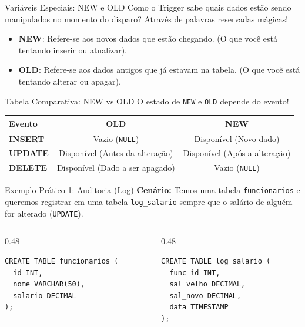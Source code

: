 \documentclass[9pt]{beamer}
\begin{document}
\begin{frame}{Variáveis Especiais: NEW e OLD}
    Como o Trigger sabe quais dados estão sendo manipulados no momento do disparo? Através de palavras reservadas mágicas!
    
    \begin{itemize}
        \item \textbf{NEW}: Refere-se aos novos dados que estão chegando. (O que você está tentando inserir ou atualizar).
        \item \textbf{OLD}: Refere-se aos dados antigos que já estavam na tabela. (O que você está tentando alterar ou apagar).
    \end{itemize}
\end{frame}

\begin{frame}{Tabela Comparativa: NEW vs OLD}
    O estado de \texttt{NEW} e \texttt{OLD} depende do evento!
    
    \vspace{0.5cm}
    \begin{center}
        \renewcommand{\arraystretch}{1.5}
        \begin{tabular}{|l|c|c|}
            \hline
            \textbf{Evento} & \textbf{OLD} & \textbf{NEW} \\
            \hline
            \textbf{INSERT} & Vazio (\texttt{NULL}) & Disponível (Novo dado) \\
            \hline
            \textbf{UPDATE} & Disponível (Antes da alteração) & Disponível (Após a alteração) \\
            \hline
            \textbf{DELETE} & Disponível (Dado a ser apagado) & Vazio (\texttt{NULL}) \\
            \hline
        \end{tabular}
    \end{center}
\end{frame}

\begin{frame}[fragile]{Exemplo Prático 1: Auditoria (Log)}
    \textbf{Cenário:} Temos uma tabela \texttt{funcionarios} e queremos registrar em uma tabela \texttt{log\_salario} sempre que o salário de alguém for alterado (\texttt{UPDATE}).
    
    \vspace{0.3cm}
    \begin{columns}
        \begin{column}{0.48\textwidth}
            \begin{lstlisting}
CREATE TABLE funcionarios (
  id INT,
  nome VARCHAR(50),
  salario DECIMAL
);
            \end{lstlisting}
        \end{column}
        \begin{column}{0.48\textwidth}
            \begin{lstlisting}
CREATE TABLE log_salario (
  func_id INT,
  sal_velho DECIMAL,
  sal_novo DECIMAL,
  data TIMESTAMP
);
            \end{lstlisting}
        \end{column}
    \end{columns}
\end{frame}
\end{document}
